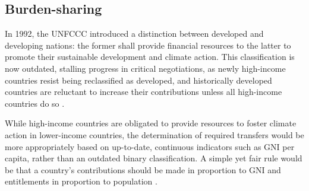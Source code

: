 \documentclass[12pt,english]{article}
\begin{document}
\subsection{Burden-sharing\label{subsubsec:burden_sharing}} %

In 1992, the UNFCCC introduced a distinction between developed and developing nations: the former shall provide financial resources to the latter to promote their sustainable development and climate action. 
This classification is now outdated, stalling progress in critical negotiations, as newly high-income countries resist being reclassified as developed, and historically developed countries are reluctant to increase their contributions unless all high-income countries do so \citep{earth_negotiations_bulletin_summary_2024,schalatek_decision_2024,eu_council_conclusions_2024}. 


While high-income countries are obligated to provide resources to foster climate action in lower-income countries, the determination of required transfers would be more appropriately based on up-to-date, continuous indicators such as GNI per capita, rather than an outdated binary classification. A simple yet fair rule would be that a country's contributions should be made in proportion to GNI and entitlements in proportion to population \citep{fabre_global_2025}. %
\end{document}
